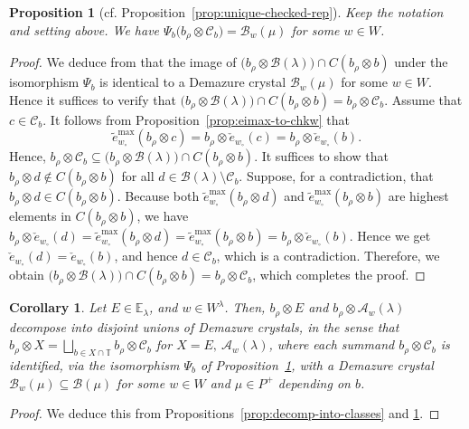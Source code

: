 \documentclass[reqno]{amsart}
\newtheorem{proposition}[theorem]{Proposition}
\newtheorem{corollary}[theorem]{Corollary}
\theoremstyle{definition}
\theoremstyle{remark}
\numberwithin{equation}{section}
\newcommand{\B}{\mathcal{B}}
\newcommand{\Tfix}{\mathbb{T}}
\newcommand{\te}{\tilde e}
\newcommand{\chke}{\check e}
\newcommand{\Bl}{\B(\lambda)}
\begin{document}
	\begin{proposition}[cf. Proposition~\ref{prop:unique-checked-rep}]\label{prop:brho-C_b}
		Keep the notation and setting above.
		We have $\Psi_b\bigl(b_\rho\otimes\mathcal{C}_b\bigr)=\B_w(\mu)$ for some $w\in W$.
	\end{proposition}
	\begin{proof}
		We deduce from \cite[Theorem 2.11]{joseph2003} that the image of
		$\bigl(b_\rho\otimes\Bl\bigr)\cap C(b_\rho\otimes b)$ under the isomorphism $\Psi_b$
		is identical to a Demazure crystal $\B_w(\mu)$ for some $w\in W$.
		Hence it suffices to verify that
		$\bigl(b_\rho\otimes\Bl\bigr)\cap C(b_\rho\otimes b)=b_\rho\otimes\mathcal{C}_b$.
		Assume that $c\in\mathcal{C}_b$.
		It follows from Proposition~\ref{prop:eimax-to-chkw} that
		$$\te_{w_\circ}^{\max}(b_\rho\otimes c)=b_\rho\otimes\chke_{w_\circ}(c)=b_\rho\otimes\chke_{w_\circ}(b).$$
		Hence, $b_\rho\otimes\mathcal{C}_b\subseteq\bigl(b_\rho\otimes\Bl\bigr)\cap C(b_\rho\otimes b)$.
		It suffices to show that $b_\rho\otimes d\notin C(b_\rho\otimes b)$ for all $d\in\Bl\setminus\mathcal{C}_b$.
		Suppose, for a contradiction, that 
		$b_\rho\otimes d\in C(b_\rho\otimes b)$.
		Because both $\te_{w_\circ}^{\max}(b_\rho\otimes d)$ and $\te_{w_\circ}^{\max}(b_\rho\otimes b)$ are highest elements in $C(b_\rho\otimes b)$,
		we have $b_\rho\otimes \chke_{w_\circ}(d)=\te_{w_\circ}^{\max}(b_\rho\otimes d)=\te_{w_\circ}^{\max}(b_\rho\otimes b)=b_\rho\otimes \chke_{w_\circ}(b)$.
		Hence we get $\chke_{w_\circ}(d)=\chke_{w_\circ}(b)$,
		and hence $d\in \mathcal{C}_b$,
		which is a contradiction.
		Therefore, we obtain $\bigl(b_\rho\otimes\Bl\bigr)\cap C(b_\rho\otimes b)=b_\rho\otimes\mathcal{C}_b$,
		which completes the proof.
	\end{proof}
	
	
	\begin{corollary}
		Let $E\in\mathbb{E}_\lambda$,
		and $w\in W^\lambda$.
		Then, $b_\rho\otimes E$ and $b_\rho\otimes \mathcal{A}_w(\lambda)$ decompose into disjoint unions of Demazure crystals,
		in the sense that $b_\rho\otimes X=\bigsqcup_{b\in X\cap\Tfix}b_\rho\otimes\mathcal{C}_b$ for $X=E,\ \mathcal{A}_w(\lambda)$,
		where each summand $b_\rho\otimes\mathcal{C}_b$ is identified, via the isomorphism $\Psi_b$ of
		Proposition~\ref{prop:brho-C_b}, with a Demazure crystal $\B_{w}(\mu)\subseteq\B(\mu)$ for some $w\in W$
		and $\mu\in P^+$ depending on $b$.
	\end{corollary}
	\begin{proof}
		We deduce this from Propositions~\ref{prop:decomp-into-classes} and \ref{prop:brho-C_b}.
	\end{proof}
	
\end{document}
